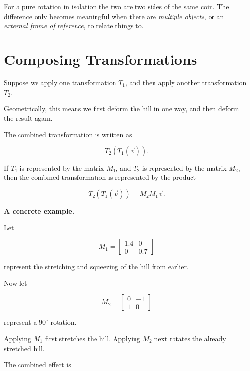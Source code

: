 \documentclass[11pt,openany]{book}
\theoremstyle{definition}
\begin{document}
For a pure rotation in isolation the two are two sides of the same coin. The difference
only becomes meaningful when there are \textit{multiple objects}, or an \textit{external
frame of reference}, to relate things to.

\section{Composing Transformations}

Suppose we apply one transformation $T_1$, and then apply another transformation $T_2$.

\medskip

Geometrically, this means we first deform the hill in one way, and then deform the result again.

\medskip

The combined transformation is written as

\[
T_2(T_1(\vec{v})).
\]

\medskip

If $T_1$ is represented by the matrix $M_1$, and $T_2$ is represented by the matrix $M_2$,
then the combined transformation is represented by the product

\[
T_2(T_1(\vec{v})) = M_2 M_1 \vec{v}.
\]

\medskip

\textbf{A concrete example.}

Let

\[
M_1 =
\begin{bmatrix}
1.4 & 0 \\
0 & 0.7
\end{bmatrix}
\]

represent the stretching and squeezing of the hill from earlier.

\medskip

Now let

\[
M_2 =
\begin{bmatrix}
0 & -1 \\
1 & 0
\end{bmatrix}
\]

represent a $90^\circ$ rotation.

\medskip

Applying $M_1$ first stretches the hill. Applying $M_2$ next rotates the already stretched hill.

\medskip

The combined effect is
\end{document}
